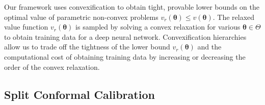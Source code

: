 \documentclass[10pt]{article} %
\theoremstyle{plain}
\theoremstyle{definition}
\theoremstyle{remark}
\begin{document}


Our framework uses convexification to obtain tight, provable lower bounds on the optimal value of parametric non-convex problems $v_r(\bm{\theta}) \leq v(\bm{\theta})$. The relaxed value function $v_r(\bm{\theta})$ is sampled by solving a convex relaxation for various $\bm{\theta} \in \Theta$ to obtain training data for a deep neural network. Convexification hierarchies allow us to trade off the tightness of the lower bound $v_r(\bm{\theta})$ and the computational cost of obtaining training data by increasing or decreasing the order of the convex relaxation.

\subsection*{Split Conformal Calibration}
\end{document}
